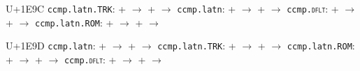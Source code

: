\documentclass{article}
\begin{document}
\begin{substitutions}
U+1E9C  \linebreak
    \texttt{ccmp.latn.TRK}:
\linebreak\null\quad{} \space +  \space $\to$  
\linebreak\null\quad{} \space +  \space $\to$  
\linebreak
\texttt{ccmp.latn}:
\linebreak\null\quad{} \space +  \space $\to$  
\linebreak\null\quad{} \space +  \space $\to$  
\linebreak
\texttt{ccmp.\textsc{dflt}}:
\linebreak\null\quad{} \space +  \space $\to$  
\linebreak\null\quad{} \space +  \space $\to$  
\linebreak
\texttt{ccmp.latn.ROM}:
\linebreak\null\quad{} \space +  \space $\to$  
\linebreak\null\quad{} \space +  \space $\to$  


\goodbreak

U+1E9D  \linebreak
    \texttt{ccmp.latn}:
\linebreak\null\quad{} \space +  \space $\to$  
\linebreak\null\quad{} \space +  \space $\to$  
\linebreak
\texttt{ccmp.latn.TRK}:
\linebreak\null\quad{} \space +  \space $\to$  
\linebreak\null\quad{} \space +  \space $\to$  
\linebreak
\texttt{ccmp.latn.ROM}:
\linebreak\null\quad{} \space +  \space $\to$  
\linebreak\null\quad{} \space +  \space $\to$  
\linebreak
\texttt{ccmp.\textsc{dflt}}:
\linebreak\null\quad{} \space +  \space $\to$  
\linebreak\null\quad{} \space +  \space $\to$  



\end{substitutions}
\end{document}
